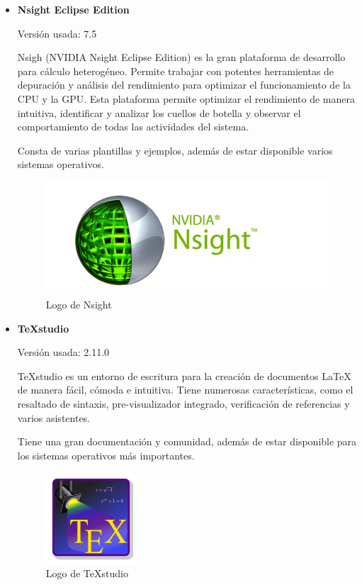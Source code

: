 \begin{itemize}
	\item \textbf{Nsight Eclipse Edition}
	
	Versión usada: 7.5
		
	Nsigh (NVIDIA Nsight Eclipse Edition) \cite{nsight} es la gran plataforma de desarrollo para cálculo heterogéneo. Permite trabajar con potentes herramientas de depuración y análisis del rendimiento para optimizar el funcionamiento de la CPU y la GPU. Esta plataforma permite optimizar el rendimiento de manera intuitiva, identificar y analizar los cuellos de botella y observar el comportamiento de todas las actividades del sistema.

	Consta de varias plantillas y ejemplos, además de estar disponible varios sistemas operativos.
 
	\bigskip
	\begin{figure}[h]
		\centering
		\includegraphics[width=0.5\linewidth]{../images/nsightlogo}
		\caption[Logo de Nsight]{Logo de Nsight}
		\label{fig:nsightlogo}
	\end{figure}
	
	\item \textbf{TeXstudio}
		
		Versión usada: 2.11.0
		
	TeXstudio \cite{texstudio} es un entorno de escritura para la creación de documentos LaTeX de manera fácil, cómoda e intuitiva. Tiene numerosas características, como el resaltado de sintaxis, pre-visualizador integrado, verificación de referencias y varios asistentes. 

	Tiene una gran documentación y comunidad, además de estar disponible para los sistemas operativos más importantes.
		
	\bigskip
	\begin{figure}[h]
		\centering
		\includegraphics[width=0.3\linewidth]{../images/texstudiologo}
		\caption[Logo de TeXstudio]{Logo de TeXstudio}
		\label{fig:texstudiologo}
	\end{figure}
			

\end{itemize}
